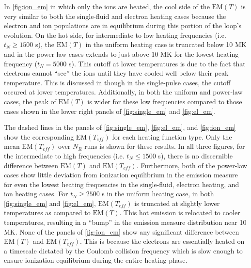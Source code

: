 \documentclass[apj]{emulateapj}
\begin{document}
	\par In \autoref{fig:ion_em} in which only the ions are heated, the cool side of the $\mathrm{EM}(T)$ is very similar to both the single-fluid and electron heating cases because the electron and ion populations are in equilibrium during this portion of the loop's evolution. On the hot side, for intermediate to low heating frequencies (i.e. $t_N\ge1500$ s), the $\mathrm{EM}(T)$ in the uniform heating case is truncated below 10 MK and in the power-law cases extends to just above 10 MK for the lowest heating frequency ($t_N=5000$ s). This cutoff at lower temperatures is due to the fact that electrons cannot ``see'' the ions until they have cooled well below their peak temperature. This is discussed in  though in the single-pulse cases, the cutoff occured at lower temperatures. Additionally, in both the uniform and power-law cases, the peak of $\mathrm{EM}(T)$ is wider for these low frequencies compared to those cases shown in the lower right panels of \autoref{fig:single_em} and \autoref{fig:el_em}.
	\par The dashed lines in the panels of \autoref{fig:single_em}, \autoref{fig:el_em}, and \autoref{fig:ion_em} show the corresponding $\mathrm{EM}(T_{eff})$ for each heating function type. Only the mean $\mathrm{EM}(T_{eff})$ over $N_R$ runs is shown for these results. In all three figures, for the intermediate to high frequencies (i.e. $t_N\le1500$ s), there is no discernible difference between $\mathrm{EM}(T)$ and $\mathrm{EM}(T_{eff})$. Furthermore, both of the power-law cases show little deviation from ionization equilibrium in the emission measure for even the lowest heating frequencies in the single-fluid, electron heating, and ion heating cases. For $t_N\ge2500$ s in the uniform heating case, in both \autoref{fig:single_em} and \autoref{fig:el_em}, $\mathrm{EM}(T_{eff})$ is truncated at slightly lower temperatures as compared to $\mathrm{EM}(T)$. This hot emission is relocated to cooler temperatures, resulting in a ``bump'' in the emission measure distribution near 10 MK. None of the panels of \autoref{fig:ion_em} show any significant difference between $\mathrm{EM}(T)$ and $\mathrm{EM}(T_{eff})$. This is because the electrons are essentially heated on a timescale dictated by the Coulomb collision frequency which is slow enough to ensure ionization equilibrium during the entire heating phase.
\end{document}
